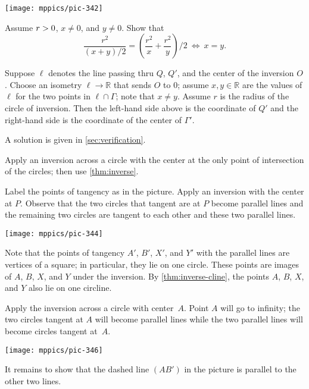 \begin{Figure}
\vskip-0mm
\centering
\texttt{[image: mppics/pic-342]}
\end{Figure}

Assume $r>0$, $x\ne 0$, and $y\ne 0$.
Show that
$$\frac{r^2}{(x+y)/2}
=
\left(\frac {r^2}x+\frac {r^2}y\right)/2\ \iff\ x=y.$$

Suppose $\ell$ denotes the line passing thru $Q$, $Q'$, and the center of the inversion $O$.
Choose an isometry $\ell\to\mathbb{R}$ that sends $O$ to $0$;
assume $x,y\in \mathbb{R}$ are the values of $\ell$ for the two points in $\ell\cap\Gamma$;
note that $x\ne y$.
Assume $r$ is the radius of the circle of inversion.
Then the left-hand side above is the coordinate of $Q'$ 
and the right-hand side is the coordinate of the center of $\Gamma'$.

A solution is given in \ref{sec:verification}.

Apply an inversion across a circle with the center at the only point of intersection of the circles;
then use \ref{thm:inverse}.

Label the points of tangency as in the picture.
Apply an inversion with the center at $P$. 
Observe that the two circles that tangent are at $P$ become parallel lines and 
the remaining two circles are tangent to each other and these two parallel lines.

\begin{Figure}
\centering
\texttt{[image: mppics/pic-344]}
\end{Figure}

Note that the points of tangency $A'$, $B'$, $X'$, and $Y'$ with the parallel lines are vertices of a square;
in particular, they lie on one circle.
These points are images of $A$, $B$, $X$, and $Y$ under the inversion.
By \ref{thm:inverse-cline}, the points $A$, $B$, $X$, and $Y$ also lie on one circline.

Apply the inversion across a circle with center~$A$. 
Point $A$ will go to infinity; the two circles tangent at $A$ will become parallel lines
while the two parallel lines will become circles tangent at~$A$.

\begin{Figure}
\centering
\texttt{[image: mppics/pic-346]}
\end{Figure}

It remains to show that the dashed line $(AB')$ in the picture is parallel to the other two lines.


